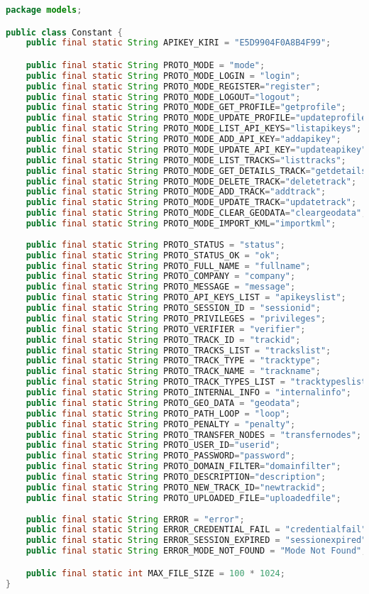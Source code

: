 \begin{lstlisting}[language=Java,basicstyle=\tiny,caption=models/Constant.java,label={lst:constant.java}]
package models;

public class Constant {
	public final static String APIKEY_KIRI = "E5D9904F0A8B4F99";

	public final static String PROTO_MODE = "mode";
	public final static String PROTO_MODE_LOGIN = "login";
	public final static String PROTO_MODE_REGISTER="register";
	public final static String PROTO_MODE_LOGOUT="logout";
	public final static String PROTO_MODE_GET_PROFILE="getprofile";
	public final static String PROTO_MODE_UPDATE_PROFILE="updateprofile";
	public final static String PROTO_MODE_LIST_API_KEYS="listapikeys";
	public final static String PROTO_MODE_ADD_API_KEY="addapikey";
	public final static String PROTO_MODE_UPDATE_API_KEY="updateapikey";
	public final static String PROTO_MODE_LIST_TRACKS="listtracks";
	public final static String PROTO_MODE_GET_DETAILS_TRACK="getdetailstrack";
	public final static String PROTO_MODE_DELETE_TRACK="deletetrack";
	public final static String PROTO_MODE_ADD_TRACK="addtrack";
	public final static String PROTO_MODE_UPDATE_TRACK="updatetrack";
	public final static String PROTO_MODE_CLEAR_GEODATA="cleargeodata";
	public final static String PROTO_MODE_IMPORT_KML="importkml";
	
	public final static String PROTO_STATUS = "status";
	public final static String PROTO_STATUS_OK = "ok";
	public final static String PROTO_FULL_NAME = "fullname";
	public final static String PROTO_COMPANY = "company";
	public final static String PROTO_MESSAGE = "message";
	public final static String PROTO_API_KEYS_LIST = "apikeyslist";
	public final static String PROTO_SESSION_ID = "sessionid";
	public final static String PROTO_PRIVILEGES = "privileges";
	public final static String PROTO_VERIFIER = "verifier";
	public final static String PROTO_TRACK_ID = "trackid";
	public final static String PROTO_TRACKS_LIST = "trackslist";
	public final static String PROTO_TRACK_TYPE = "tracktype";
	public final static String PROTO_TRACK_NAME = "trackname";
	public final static String PROTO_TRACK_TYPES_LIST = "tracktypeslist";
	public final static String PROTO_INTERNAL_INFO = "internalinfo";
	public final static String PROTO_GEO_DATA = "geodata";
	public final static String PROTO_PATH_LOOP = "loop";
	public final static String PROTO_PENALTY = "penalty";
	public final static String PROTO_TRANSFER_NODES = "transfernodes";
	public final static String PROTO_USER_ID="userid";
	public final static String PROTO_PASSWORD="password";
	public final static String PROTO_DOMAIN_FILTER="domainfilter";
	public final static String PROTO_DESCRIPTION="description";
	public final static String PROTO_NEW_TRACK_ID="newtrackid";
	public final static String PROTO_UPLOADED_FILE="uploadedfile";
	
	public final static String ERROR = "error";
	public final static String ERROR_CREDENTIAL_FAIL = "credentialfail";
	public final static String ERROR_SESSION_EXPIRED = "sessionexpired";
	public final static String ERROR_MODE_NOT_FOUND = "Mode Not Found";

	public final static int MAX_FILE_SIZE = 100 * 1024;
}
\end{lstlisting}

